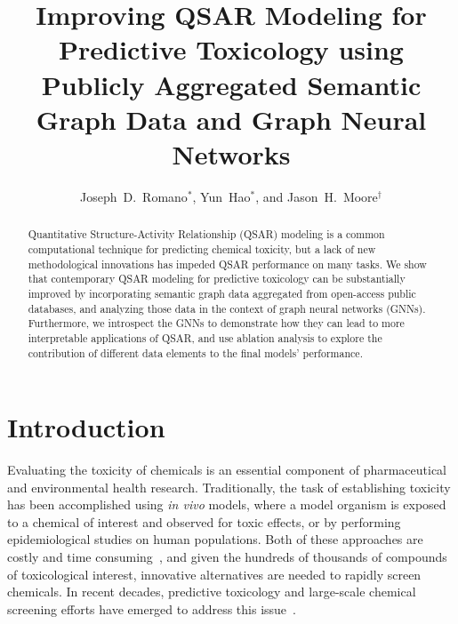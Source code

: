 \documentclass{ws-procs11x85}
\begin{document}
\title{Improving QSAR Modeling for Predictive Toxicology using Publicly Aggregated Semantic Graph Data and Graph Neural Networks}

\author{Joseph~D.~Romano$^*$, Yun~Hao$^*$, and Jason~H.~Moore$^\dag$}

\address{Institute for Biomedical Informatics, University of Pennsylvania,\\
Philadelphia, Pennsylvania 19104, United States\\
$^\dag$Corresponding author e-mail: jhmoore@upenn.edu\\
$^*$These authors contributed equally.}


\begin{abstract}
Quantitative Structure-Activity Relationship (QSAR) modeling is a common computational technique for predicting chemical toxicity, but a lack of new methodological innovations has impeded QSAR performance on many tasks.
We show that contemporary QSAR modeling for predictive toxicology can be substantially improved by incorporating semantic graph data aggregated from open-access public databases, and analyzing those data in the context of graph neural networks (GNNs).
Furthermore, we introspect the GNNs to demonstrate how they can lead to more interpretable applications of QSAR, and use ablation analysis to explore the contribution of different data elements to the final models' performance.
\end{abstract}


\section{Introduction}\label{introduction}
Evaluating the toxicity of chemicals is an essential component of pharmaceutical and environmental health research.
Traditionally, the task of establishing toxicity has been accomplished using \textit{in vivo} models, where a model organism is exposed to a chemical of interest and observed for toxic effects, or by performing epidemiological studies on human populations.
Both of these approaches are costly and time consuming~\cite{raies2016silico}, and given the hundreds of thousands of compounds of toxicological interest, innovative alternatives are needed to rapidly screen chemicals.
In recent decades, predictive toxicology and large-scale chemical screening efforts have emerged to address this issue~\cite{tice2013improving,roncaglioni2013silico}.
\end{document}
